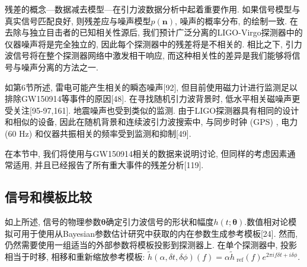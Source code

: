 \documentclass[a4paper]{\documentclassname}
\def\b{\boldsymbol}
\def\t{\text}
\def\ti{\tilde}
\theoremstyle{definition}
\begin{document}
残差的概念---数据减去模型---在引力波数据分析中起着重要作用. 如果信号模型与真实信号匹配良好, 则残差应与噪声模型$p ({\b{n}}) $, 噪声的概率分布, 的绘制一致. 在去除与独立目击者的已知相关性源后, 我们预计广泛分离的LIGO-Virgo探测器中的仪器噪声将是完全独立的, 因此每个探测器中的残差将是不相关的. 相比之下, 引力波信号将在整个探测器网络中激发相干响应, 而这种相关性的差异是我们能够将信号与噪声分离的方法之一. 

如第6节所述, 雷电可能产生相关的瞬态噪声[92], 但目前使用磁力计进行监测足以排除GW150914等事件的原因[48]. 在寻找随机引力波背景时, 低水平相关磁噪声更受关注[95-97,161].  地震噪声也受到类似的监测. 由于LIGO探测器具有相同的设计和相似的设备, 因此在随机背景和连续波引力波搜索中, 与同步时钟 (GPS) , 电力 (60 Hz) 和仪器共振相关的频率受到监测和抑制[49]. 

在本节中, 我们将使用与GW150914相关的数据来说明讨论, 但同样的考虑因素通常适用, 并且已经报告了所有重大事件的残差分析[119]. 

\subsection{信号和模板比较}

如上所述, 信号的物理参数$\b{\theta}$确定引力波信号的形状和幅度$h (t;\b{\theta}) $.数值相对论模拟可用于使用从Bayesian参数估计研究中获取的内在参数生成参考模板[24]. 然而, 仍然需要使用一组适当的外部参数将模板投影到探测器上. 在单个探测器中, 投影相当于时移, 相移和重新缩放参考模板: $\ti{ h} (\alpha,  \delta t,  \delta \phi)  (f)  = \alpha  \ti{ h}_{\t{ ref}} (f)  e^{2 \pi i f \delta t + i\delta \phi}$.
\end{document}
